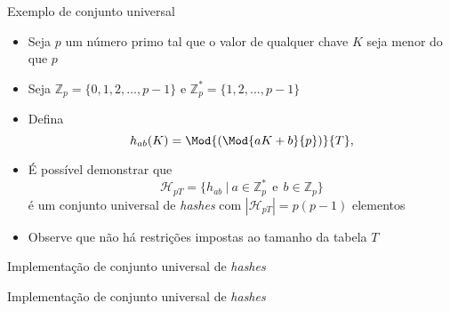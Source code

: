 \begin{frame}[fragile]{Exemplo de conjunto universal}

    \begin{itemize}
        \item Seja $p$ um número primo tal que o valor de qualquer chave $K$ seja menor do que $p$

        \item Seja $\mathbb{Z}_p = \lbrace 0, 1, 2, \ldots, p - 1\rbrace$ e $\mathbb{Z}_p^* = \lbrace 1, 2, \ldots, p - 1\rbrace$ 

        \item Defina
        \[
            h_{ab}(K) = \Mod{(\Mod{aK + b}{p})}{T},
        \]

        \item É possível demonstrar que
        \[
            \mathcal{H}_{pT} = \lbrace h_{ab}\ | \ a\in \mathbb{Z}_p^*\ \ \mbox{e}\ \  b \in \mathbb{Z}_p \rbrace
        \]
        é um conjunto universal de \textit{hashes} com $|\mathcal{H}_{pT}| = p(p - 1)$ elementos

        \item Observe que não há restrições impostas ao tamanho da tabela $T$

    \end{itemize}

\end{frame}



\begin{frame}[fragile]{Implementação de conjunto universal de \textit{hashes}}
\end{frame}

\begin{frame}[fragile]{Implementação de conjunto universal de \textit{hashes}}
\end{frame}
